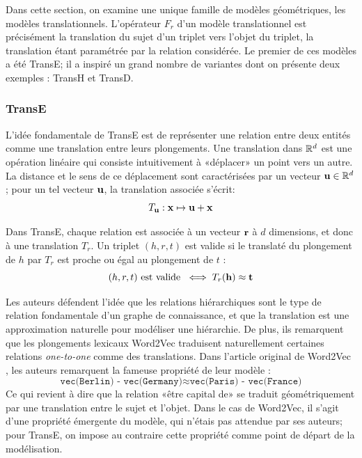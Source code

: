 Dans cette section, on examine une unique famille de modèles géométriques, les modèles translationnels. L'opérateur $F_r$ d'un modèle translationnel est précisément la translation du sujet d'un triplet vers l'objet du triplet, la translation étant paramétrée par la relation considérée. Le premier de ces modèles a été TransE; il a inspiré un grand nombre de variantes dont on présente deux exemples : TransH et TransD.

\subsubsection{TransE \cite{bordes2013translating}}

L'idée fondamentale de TransE est de représenter une relation entre deux entités comme une translation entre leurs plongements. Une translation dans $\R^d$ est une opération linéaire qui consiste intuitivement à «déplacer» un point vers un autre. La distance et le sens de ce déplacement sont caractérisées par un vecteur $\bf{u} \in \R^d$; pour un tel vecteur $\bf{u}$, la translation associée s'écrit:
\begin{equation}
    T_\bf{u} : \bf{x} \mapsto \bf{u + x}
\end{equation}

Dans TransE, chaque relation est associée à un vecteur $\bf{r}$ à $d$ dimensions, et donc à une translation $T_r$. Un triplet $(h, r, t)$ est valide si le translaté du plongement de $h$ par $T_r$ est proche ou égal au plongement de $t$ :
\begin{equation}
    (h, r, t) \text{ est valide } \iff T_r(\bf{h}) \approx \bf{t} 
\end{equation}

Les auteurs défendent l'idée que les relations hiérarchiques sont le type de relation fondamentale d'un graphe de connaissance, et que la translation est une approximation naturelle pour modéliser une hiérarchie. %
De plus, ils remarquent que les plongements lexicaux Word2Vec \cite{mikolov2013distributed} traduisent naturellement certaines relations \textit{one-to-one} comme des translations. Dans l'article original de Word2Vec \cite{mikolov2013distributed}, les auteurs remarquent la fameuse propriété de leur modèle :
\begin{equation}
    \texttt{vec(Berlin) - vec(Germany)} \approx 
    \texttt{vec(Paris) - vec(France)}
\end{equation}
Ce qui revient à dire que la relation «être capital de» se traduit géométriquement par une translation entre le sujet et l'objet. Dans le cas de Word2Vec, il s'agit d'une propriété émergente du modèle, qui n'étais pas attendue par ses auteurs; pour TransE, on impose au contraire cette propriété comme point de départ de la modélisation.

